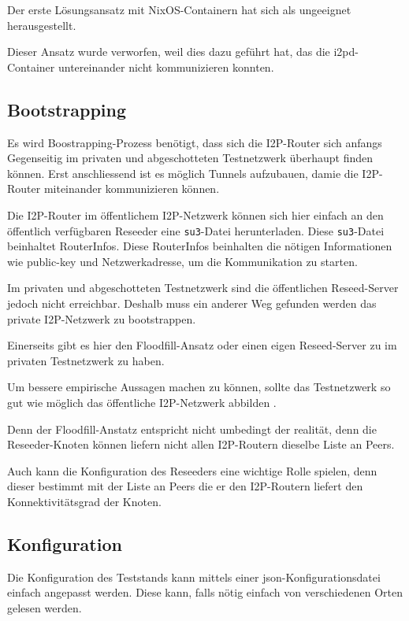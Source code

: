 Der erste Lösungsansatz mit NixOS-Containern hat sich als ungeeignet herausgestellt. 

Dieser Ansatz wurde verworfen, weil dies dazu geführt hat, das die i2pd-Container untereinander nicht kommunizieren konnten.

\subsection{Bootstrapping}

Es wird Boostrapping-Prozess benötigt, dass sich die I2P-Router sich anfangs Gegenseitig im privaten und abgeschotteten Testnetzwerk überhaupt finden können.
Erst anschliessend ist es möglich Tunnels aufzubauen, damie die I2P-Router miteinander kommunizieren können.

Die I2P-Router im öffentlichem I2P-Netzwerk können sich hier einfach an den öffentlich verfügbaren Reseeder eine \lstinline|su3|-Datei herunterladen.
Diese \lstinline|su3|-Datei beinhaltet RouterInfos. 
Diese RouterInfos beinhalten die nötigen Informationen wie public-key und Netzwerkadresse, um die Kommunikation zu starten.

Im privaten und abgeschotteten Testnetzwerk sind die öffentlichen Reseed-Server jedoch nicht erreichbar.
Deshalb muss ein anderer Weg gefunden werden das private I2P-Netzwerk zu bootstrappen.

Einerseits gibt es hier den Floodfill-Ansatz oder einen eigen Reseed-Server zu im privaten Testnetzwerk zu haben.


Um bessere empirische Aussagen machen zu können, sollte das Testnetzwerk so gut wie möglich das öffentliche I2P-Netzwerk abbilden .

Denn der Floodfill-Anstatz entspricht nicht umbedingt der realität, denn die Reseeder-Knoten können liefern nicht allen I2P-Routern dieselbe Liste an Peers.

Auch kann die Konfiguration des Reseeders eine wichtige Rolle spielen, denn dieser bestimmt mit der Liste an Peers die er den I2P-Routern liefert den Konnektivitätsgrad der Knoten.


\subsection{Konfiguration}

Die Konfiguration des Teststands kann mittels einer json-Konfigurationsdatei einfach angepasst werden.
Diese kann, falls nötig einfach von verschiedenen Orten gelesen werden.

